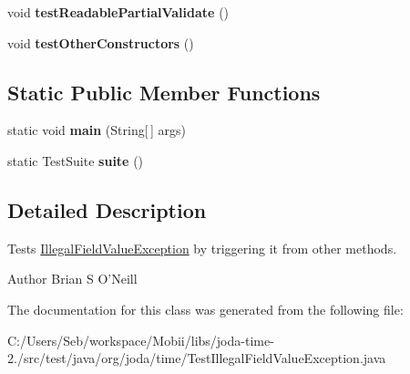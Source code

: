 \begin{DoxyCompactItemize}
\item 
\hypertarget{classorg_1_1joda_1_1time_1_1_test_illegal_field_value_exception_a30a3d0e04d7bc6888a8b04bbcf628f62}{void {\bfseries test\-Readable\-Partial\-Validate} ()}\label{classorg_1_1joda_1_1time_1_1_test_illegal_field_value_exception_a30a3d0e04d7bc6888a8b04bbcf628f62}

\item 
\hypertarget{classorg_1_1joda_1_1time_1_1_test_illegal_field_value_exception_ad4fa593d757b157f331265dd7bf47a2e}{void {\bfseries test\-Other\-Constructors} ()}\label{classorg_1_1joda_1_1time_1_1_test_illegal_field_value_exception_ad4fa593d757b157f331265dd7bf47a2e}

\end{DoxyCompactItemize}
\subsection*{Static Public Member Functions}
\begin{DoxyCompactItemize}
\item 
\hypertarget{classorg_1_1joda_1_1time_1_1_test_illegal_field_value_exception_a3f39b17e7d90eab19b590260e3112fd5}{static void {\bfseries main} (String\mbox{[}$\,$\mbox{]} args)}\label{classorg_1_1joda_1_1time_1_1_test_illegal_field_value_exception_a3f39b17e7d90eab19b590260e3112fd5}

\item 
\hypertarget{classorg_1_1joda_1_1time_1_1_test_illegal_field_value_exception_a46c915ea7e6e048dcabb1afbca55cd1d}{static Test\-Suite {\bfseries suite} ()}\label{classorg_1_1joda_1_1time_1_1_test_illegal_field_value_exception_a46c915ea7e6e048dcabb1afbca55cd1d}

\end{DoxyCompactItemize}


\subsection{Detailed Description}
Tests \hyperlink{classorg_1_1joda_1_1time_1_1_illegal_field_value_exception}{Illegal\-Field\-Value\-Exception} by triggering it from other methods.

\begin{DoxyAuthor}{Author}
Brian S O'Neill 
\end{DoxyAuthor}


The documentation for this class was generated from the following file\-:\begin{DoxyCompactItemize}
\item 
C\-:/\-Users/\-Seb/workspace/\-Mobii/libs/joda-\/time-\/2./src/test/java/org/joda/time/Test\-Illegal\-Field\-Value\-Exception.\-java\end{DoxyCompactItemize}
